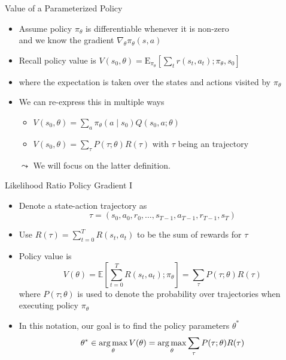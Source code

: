 \documentclass[aspectratio=169]{../latex_main/tntbeamer}  %
\begin{document}
\begin{frame}[c]{Value of a Parameterized Policy}

\begin{itemize}
	\item Assume policy $\pi_\theta$ is differentiable whenever it is non-zero\\
	 and we know the gradient $\nabla_\theta \pi_\theta (s,a)$
	\item Recall policy value is $V(s_0, \theta) = \mathrm{E}_{\pi_\theta}\left[ \sum_{t} r(s_t, a_t); \pi_\theta, s_0 \right]$
	\item where the expectation is taken over the states and actions visited by $\pi_\theta$
	\item We can re-express this in multiple ways
	\begin{itemize}
	    \item $V(s_0,\theta) = \sum_a \pi_\theta (a \mid s_0) Q(s_0, a; \theta)$
	    \item $V(s_0, \theta) = \sum_\tau P(\tau; \theta) R(\tau)$ with $\tau$ being an trajectory
	\end{itemize}
	\item[$\leadsto$] We will focus on the latter definition.
\end{itemize}

\end{frame}
\begin{frame}[c]{Likelihood Ratio Policy Gradient I }
	
	\begin{itemize}
		\item Denote a state-action trajectory as 
		$$ \tau = (s_0, a_0, r_0, \ldots, s_{T-1}, a_{T-1}, r_{T-1}, s_T) $$
		\item Use $R(\tau) = \sum_{t=0}^{T} R(s_t, a_t)$ to be the sum of rewards for $\tau$
		\item Policy value is 
		$$V(\theta) = \mathbb{E}\left[\sum_{t=0}^T R(s_t, a_t); \pi_\theta \right] = \sum_{\tau} P(\tau; \theta)R(\tau) $$
		where $P(\tau; \theta)$ is used to denote the probability over trajectories when executing policy $\pi_\theta$
		\item In this notation, our goal is to find the policy parameters $\theta^*$
		$$\theta^* \in \operatorname*{arg\,max}_{\theta} V(\theta) = \operatorname*{arg\,max}_{\theta}\sum_{\tau} P(\tau; \theta) R(\tau) $$
		
	\end{itemize}
	
\end{frame}
\end{document}

